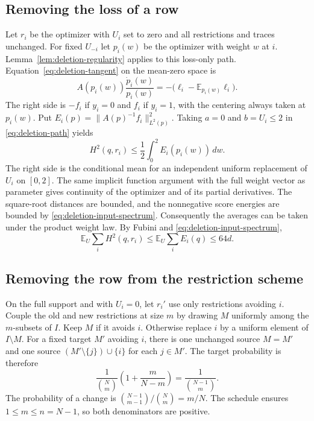 \documentclass[11pt]{article}
\theoremstyle{definition}\newtheorem{definition}[theorem]{Definition}
\begin{document}
\subsection{Removing the loss of a row}

Let $r_i$ be the optimizer with $U_i$ set to zero and all restrictions and
traces unchanged. For fixed $U_{-i}$ let $p_i(w)$ be the optimizer with weight
$w$ at $i$. Lemma~\ref{lem:deletion-regularity} applies to this loss-only
path. Equation~\eqref{eq:deletion-tangent} on the mean-zero space is
\[
  A(p_i(w))\frac{\dot p_i(w)}{p_i(w)}
      =-\bigl(\ell_i-\mathbb E_{p_i(w)}\ell_i\bigr).
\]
The right side is $-f_i$ if $y_i=0$ and $f_i$ if $y_i=1$, with the centering
always taken at $p_i(w)$. Put $E_i(p)=\|A(p)^{-1}f_i\|_{L^2(p)}^2$. Taking
$a=0$ and $b=U_i\le2$ in \eqref{eq:deletion-path} yields
\begin{equation}
  H^2(q,r_i)\le\frac12\int_0^2 E_i(p_i(w))\,dw.
  \label{eq:deletion-loss-pointwise}
\end{equation}
The right side is the conditional mean for an independent
uniform replacement of $U_i$ on $[0,2]$. The same implicit function argument
with the full weight vector as parameter gives continuity of the optimizer
and of its partial derivatives. The square-root distances are bounded, and
the nonnegative score energies are bounded by \eqref{eq:deletion-input-spectrum}.
Consequently the averages can be taken under the product weight law. By
Fubini and \eqref{eq:deletion-input-spectrum},
\begin{equation}
  \mathbb E_U\sum_i H^2(q,r_i)\le\mathbb E_U\sum_i E_i(q)\le 64d.
  \label{eq:deletion-loss-budget}
\end{equation}

\subsection{Removing the row from the restriction scheme}

On the full support and with $U_i=0$, let $r_i'$ use only restrictions avoiding
$i$. Couple the old and new restrictions at size $m$ by drawing $M$ uniformly
among the $m$-subsets of $I$. Keep $M$ if it avoids $i$. Otherwise replace $i$
by a uniform element of $I\setminus M$. For a fixed target $M'$ avoiding $i$,
there is one unchanged source $M=M'$ and one source
$(M'\setminus\{j\})\cup\{i\}$ for each $j\in M'$. The target probability is
therefore
\[
  \frac{1}{\binom Nm}\left(1+\frac{m}{N-m}\right)
     =\frac{1}{\binom{N-1}{m}}.
\]
The probability of a change is $\binom{N-1}{m-1}/\binom Nm=m/N$. The
schedule ensures $1\le m\le n=N-1$, so both denominators are positive.
\end{document}
